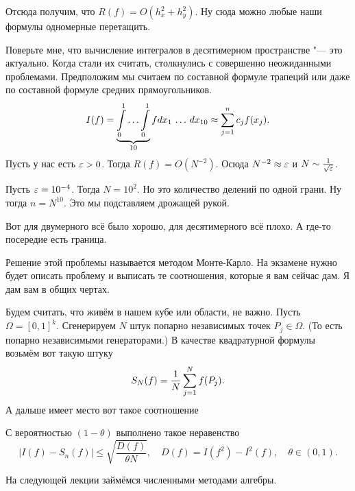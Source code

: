 Отсюда получим, что $R(f) = O \left( h_x^2 + h_y^2 \right)$.
Ну сюда можно любые наши формулы одномерные перетащить.

Поверьте мне, что вычисление интегралов в десятимерном пространстве "--- это актуально. Когда стали их считать, столкнулись с совершенно неожиданными проблемами. Предположим мы считаем по составной формуле трапеций или даже по составной формуле средних прямоугольников.
\[
  I(f) = \underbrace{\INT_0^1\dots\INT_0^1}_{10} f dx_1\,\dots\,dx_{10} \approx \RY j1n c_j f(x_j).
\]
Пусть у нас есть $\varepsilon>0$. Тогда $R(f) = O(N^{-2})$. Осюда $N^{-2}\approx \varepsilon$ и $N\sim \frac1{\sqrt{\varepsilon}}$.

Пусть $\varepsilon = 10^{-4}$. Тогда $N=10^2$. Но это количество делений по одной грани. Ну тогда $n=N^{10}$. Это мы подставляем дрожащей рукой.

Вот для двумерного всё было хорошо, для десятимерного всё плохо. А где-то посередие есть граница.

Решение этой проблемы называется методом Монте-Карло. На экзамене нужно будет описать проблему и выписать те соотношения, которые я вам сейчас дам. Я дам вам в общих чертах.

Будем считать, что живём в нашем кубе или области, не важно. Пусть $\Omega = [0,1]^k$. Сгенерируем $N$ штук попарно независимых точек $P_j\in \Omega$. (То есть попарно независимыми генераторами.) В качестве квадратурной формулы возьмём вот такую штуку
\[
  S_N(f) = \frac1N \sum\limits_{j = 1}^{N} f(P_j).
\]
А дальше имеет место вот такое соотношение
\begin{The}
 С вероятностью $(1-\theta)$ выполнено такое неравенство
\[
 \big| I(f) - S_n(f)\big| \le \sqrt{\frac{D(f)}{\theta N}},\quad
 D(f) = I(f^2) - I^2(f),\quad \theta\in(0,1).
\]
\end{The}

На следующей лекции займёмся численными методами алгебры.
